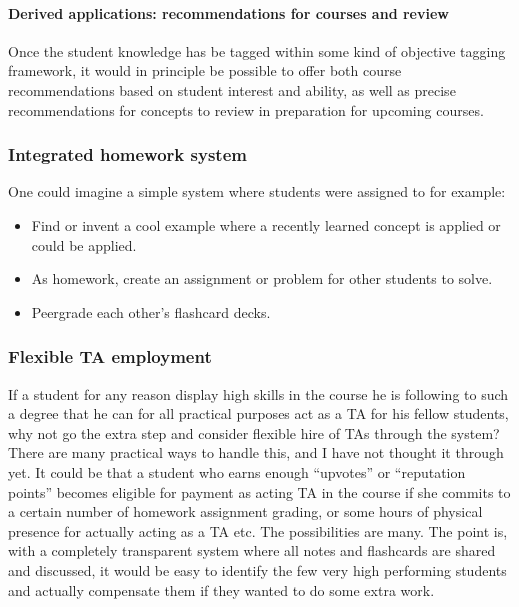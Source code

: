 \paragraph{Derived applications: recommendations for courses and
review}\label{derived-applications-recommendations-for-courses-and-review}

Once the student knowledge has be tagged within some kind of objective
tagging framework, it would in principle be possible to offer both
course recommendations based on student interest and ability, as well as
precise recommendations for concepts to review in preparation for
upcoming courses.

\hypertarget{integrated-homework-system}{\subsubsection{Integrated
homework system}\label{integrated-homework-system}}

One could imagine a simple system where students were assigned to for
example:

\begin{itemize}
\tightlist
\item
  Find or invent a cool example where a recently learned concept is
  applied or could be applied.
\item
  As homework, create an assignment or problem for other students to
  solve.
\item
  Peergrade each other's flashcard decks.
\end{itemize}

\subsubsection{Flexible TA employment}\label{flexible-ta-employment}

If a student for any reason display high skills in the course he is
following to such a degree that he can for all practical purposes act as
a TA for his fellow students, why not go the extra step and consider
flexible hire of TAs through the system? There are many practical ways
to handle this, and I have not thought it through yet. It could be that
a student who earns enough ``upvotes'' or ``reputation points'' becomes
eligible for payment as acting TA in the course if she commits to a
certain number of homework assignment grading, or some hours of physical
presence for actually acting as a TA etc. The possibilities are many.
The point is, with a completely transparent system where all notes and
flashcards are shared and discussed, it would be easy to identify the
few very high performing students and actually compensate them if they
wanted to do some extra work.

